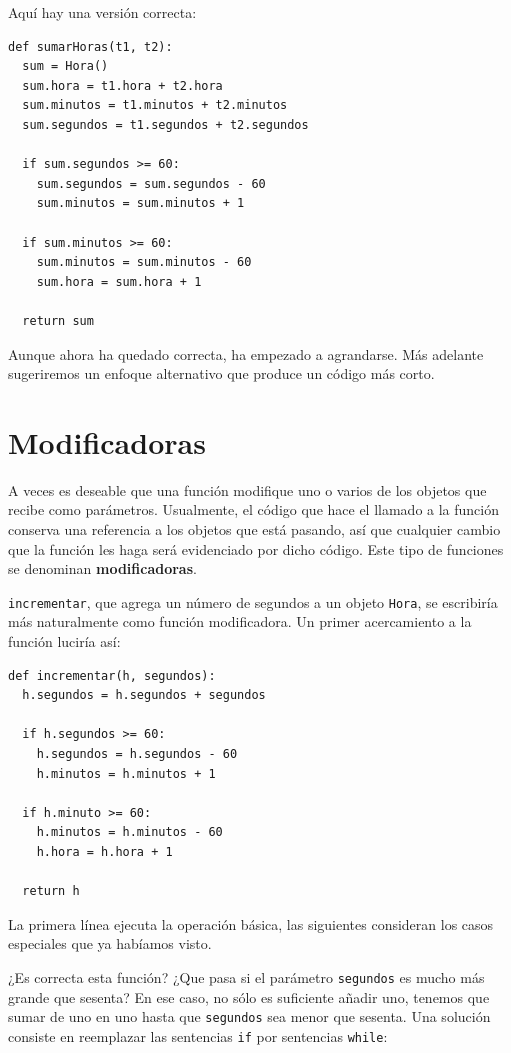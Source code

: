 Aquí hay una versión correcta:

\begin{verbatim}
def sumarHoras(t1, t2):
  sum = Hora()
  sum.hora = t1.hora + t2.hora
  sum.minutos = t1.minutos + t2.minutos
  sum.segundos = t1.segundos + t2.segundos

  if sum.segundos >= 60:
    sum.segundos = sum.segundos - 60
    sum.minutos = sum.minutos + 1

  if sum.minutos >= 60:
    sum.minutos = sum.minutos - 60
    sum.hora = sum.hora + 1

  return sum
\end{verbatim}

Aunque ahora ha quedado correcta, ha empezado a agrandarse. Más
adelante sugeriremos un enfoque alternativo que produce un código
más corto.


\section{Modificadoras}
\label{increment}

A veces es deseable que  una función modifique uno o varios
de los objetos que recibe como parámetros. Usualmente, el 
código que hace el llamado a la función conserva una referencia a los
objetos que está pasando, así que cualquier cambio que la
función les haga será evidenciado por dicho código.
Este tipo de funciones se denominan {\bf modificadoras}.

\texttt{incrementar}, que agrega un número de segundos
a un objeto \texttt{Hora}, se escribiría más naturalmente
como función modificadora. Un primer acercamiento a la 
función luciría así:


\begin{verbatim}
def incrementar(h, segundos):
  h.segundos = h.segundos + segundos

  if h.segundos >= 60:
    h.segundos = h.segundos - 60
    h.minutos = h.minutos + 1

  if h.minuto >= 60:
    h.minutos = h.minutos - 60
    h.hora = h.hora + 1

  return h
\end{verbatim}
%
La primera línea ejecuta la operación básica, las siguientes
consideran los casos especiales que ya habíamos visto.

¿Es correcta esta función? ¿Que pasa si el parámetro
 \texttt{segundos} es mucho más grande que sesenta?
 En ese caso, no sólo es suficiente añadir uno, tenemos
que sumar de uno en uno hasta que  \texttt{segundos} sea
menor que sesenta.
Una solución consiste en reemplazar las sentencias  \texttt{if}  por sentencias \texttt{while}:

